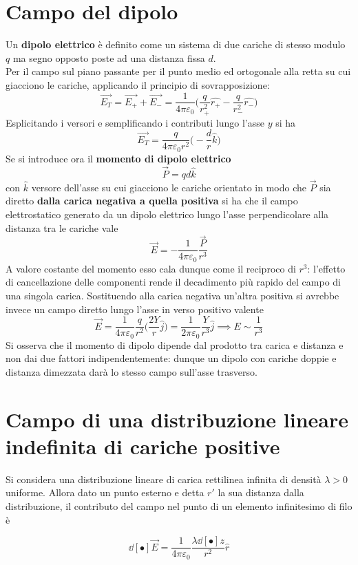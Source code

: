 \section{Campo del dipolo}
Un \textbf{dipolo elettrico} è definito come un sistema di due cariche di stesso modulo $q$ ma segno opposto poste ad una distanza fissa $d$. 
\\Per il campo sul piano passante per il punto medio ed ortogonale alla retta su cui giacciono le cariche, applicando il principio di sovrapposizione:
\[\vec{E_T} = \vec{E_+} + \vec{E_{-}} = \frac{1}{4 \pi \varepsilon_0} \big(\frac{q}{r_+^2} \hat{r_+} - \frac{q}{r_-^2} \hat{r_-}\big)\]
Esplicitando i versori e semplificando i contributi lungo l'asse $y$ si ha
\[\vec{E_T} = \frac{q}{4 \pi \varepsilon_0 r^2} \big(- \frac{d}{r} \hat{k}\big)\]
Se si introduce ora il \textbf{momento di dipolo elettrico}
\[\vec{P} = q d \hat{k}\]
con $\hat{k}$ versore dell'asse su cui giacciono le cariche orientato in modo che $\vec{P}$ sia diretto \textbf{dalla carica negativa a quella positiva} si ha che il campo elettrostatico generato da un dipolo elettrico lungo l'asse perpendicolare alla distanza tra le cariche vale
\[\vec{E} = - \frac{1}{4 \pi \varepsilon_0} \frac{\vec{P}}{r^3}\]
A valore costante del momento esso cala dunque come il reciproco di $r^3$: l'effetto di cancellazione delle componenti rende il decadimento più rapido del campo di una singola carica. Sostituendo alla carica negativa un'altra positiva si avrebbe invece un campo diretto lungo l'asse in verso positivo valente
\[\vec{E} = \frac{1}{4 \pi \varepsilon_0} \frac{q}{r^2} \big(\frac{2Y}{r} \hat{j}\big) = \frac{1}{2 \pi \varepsilon_0} \frac{Y}{r^3} \hat{j} \implies E \sim \frac{1}{r^3}\]
Si osserva che il momento di dipolo dipende dal prodotto tra carica e distanza e non dai due fattori indipendentemente: dunque un dipolo con cariche doppie e distanza dimezzata darà lo stesso campo sull'asse trasverso.

\section{Campo di una distribuzione lineare indefinita di cariche positive}
Si considera una distribuzione lineare di carica rettilinea infinita di densità $\lambda > 0$ uniforme. Allora dato un punto esterno e detta $r'$ la sua distanza dalla distribuzione, il contributo del campo nel punto di un elemento infinitesimo di filo è

\[\dd[•]{\vec{E}} = \frac{1}{4 \pi \varepsilon_0} \frac{\lambda \dd[•]{z}}{r^2} \hat{r}\]

